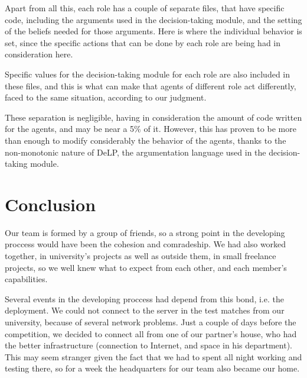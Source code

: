 \documentclass{llncs2e/llncs}
\begin{document}
    Apart from all this, each role has a couple of separate files, that have 
    specific code, including the arguments used in the decision-taking module, and
    the setting of the beliefs needed for those arguments. Here is where the 
    individual behavior is set, since the specific actions that can be done by each
    role are being had in consideration here.
    
    Specific values for the decision-taking module for each role are also included
    in these files, and this is what can make that agents of different role act 
    differently, faced to the same situation, according to our judgment.
    
    These separation is negligible, having in consideration the amount of code 
    written for the agents, and may be near a 5\% of it. However, this has proven to
    be more than enough to modify considerably the behavior of the agents, thanks to
    the non-monotonic nature of DeLP, the argumentation language used in the 
    decision-taking module.

\section{Conclusion}

\begin{comment}
PREGUNTAS {
1. What have you learned from the participation in the contest?
2. Which are the strong and weak points of the team?
3. How suitable was the chosen programming language, methodology, tools, and 
algorithms?
4. What can be improved in the context for next year?
5. Why did your team perform as it did? Why did the other teams perform 
better/worse than you did?
6. Which other research fields might be interested in the Multi-Agent 
Programming Contest?
7. How can the current scenario be optimized? How would those optimization pay 
off?
}
\end{comment}
    
    Our team is formed by a group of friends, so a strong point in the developing 
    proccess would have been the cohesion and comradeship. We had also worked 
    together, in university's projects as well as outside them, in small freelance 
    projects, so we well knew what to expect from each other, and each member's 
    capabilities. 

    Several events in the developing proccess had depend from this bond, i.e. the 
    deployment. We could not connect to the server in the test matches from our 
    university, because of several network problems. Just a couple of days before 
    the competition, we decided to connect all from one of our partner's house, 
    who had the better infrastructure (connection to Internet, and space in his 
    department). This may seem stranger given the fact that we had to spent all 
    night working and testing there, so for a week the headquarters for our team 
    also became our home.
\end{document}
